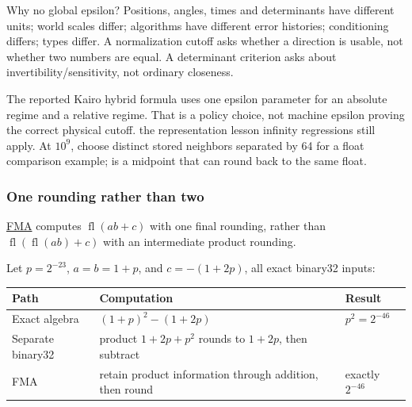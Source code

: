Why no global epsilon? Positions, angles, times and determinants have different units; world scales differ; algorithms have different error histories; conditioning differs; types differ. A normalization cutoff asks whether a direction is usable, not whether two numbers are equal. A determinant criterion asks about invertibility/sensitivity, not ordinary closeness.

The reported Kairo hybrid formula uses one epsilon parameter for an absolute regime and a relative regime. That is a policy choice, not machine epsilon proving the correct physical cutoff. the representation lesson infinity regressions still apply. At \(10^9\), choose distinct stored neighbors separated by 64 for a float comparison example;  is a midpoint that can round back to the same float.

\subsubsection{One rounding rather than two}\label{01-foundations-i-ch001-one-rounding-rather-than-two}

\hypertarget{01-foundations-i-ch001-one-rounding-rather-than-two}{}

\hyperref[appendix-41e8ef22a21e]{FMA} computes \(\operatorname{fl}(ab+c)\) with one final rounding, rather than \(\operatorname{fl}(\operatorname{fl}(ab)+c)\) with an intermediate product rounding.

Let \(p=2^{-23}\), \(a=b=1+p\), and \(c=-(1+2p)\), all exact binary32 inputs:

{\def\LTcaptype{none} %
\begin{longtable}[]{@{}
  >{\raggedright\arraybackslash}p{}
  >{\raggedright\arraybackslash}p{}
  >{\raggedright\arraybackslash}p{}@{}}
\toprule\noalign{}
\begin{minipage}[b]{\linewidth}\raggedright
Path
\end{minipage} & \begin{minipage}[b]{\linewidth}\raggedright
Computation
\end{minipage} & \begin{minipage}[b]{\linewidth}\raggedright
Result
\end{minipage} \\
\midrule\noalign{}
\endhead
\bottomrule\noalign{}
\endlastfoot
Exact algebra & \((1+p)^2-(1+2p)\) & \(p^2=2^{-46}\) \\
Separate binary32 & product \(1+2p+p^2\) rounds to \(1+2p\), then subtract & 0 \\
FMA & retain product information through addition, then round & exactly \(2^{-46}\) \\
\end{longtable}
}

